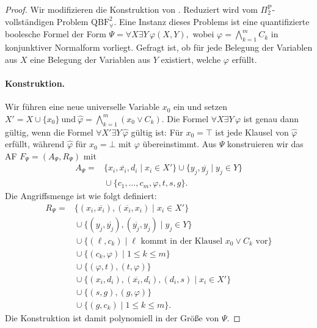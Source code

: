 \begin{proof}
    \label{pr:ocf-af-ci-co-pi^2-c-is-correct}
    Wir modifizieren die Konstruktion von \textcite{bluemel:2025:independence-aba}.
    Reduziert wird vom \(\Pi_2^{\mathrm{P}}\)-vollständigen Problem
    \(\mathrm{QBF}^{2}_{\forall}\). Eine Instanz dieses Problems ist
    eine quantifizierte boolesche Formel der Form
    \(\Psi=\forall X\exists Y\,\varphi(X,Y), \)
    wobei \(\varphi=\bigwedge_{k=1}^{m}C_k\) in konjunktiver
    Normalform vorliegt. Gefragt ist, ob für jede Belegung der
    Variablen aus \(X\) eine Belegung der Variablen aus \(Y\)
    existiert, welche \(\varphi\) erfüllt.

    \paragraph{Konstruktion.}
    Wir führen eine neue universelle
    Variable \(x_0\) ein und setzen
    \( X'=X\cup\{x_0\}~
        \text{und}~
        \widehat{\varphi}
        =
        \bigwedge_{k=1}^{m}(x_0\lor C_k).\)
    Die Formel \(\forall X\exists Y\,\varphi\) ist genau dann gültig,
    wenn die Formel \(\forall X'\exists Y\,\widehat{\varphi}\) gültig ist:
    Für \(x_0=\top\) ist jede Klausel von \(\widehat{\varphi}\) erfüllt,
    während \(\widehat{\varphi}\) für \(x_0=\bot\) mit \(\varphi\)
    übereinstimmt.
    Aus \(\Psi\) konstruieren wir das AF
    \(F_{\Psi}=(A_{\Psi},R_{\Psi})\) mit
    \[
    \begin{split}
        A_{\Psi}={}&
        \{x_i,\overline{x_i},d_i\mid x_i\in X'\}
        \cup
        \{y_j,\overline{y_j}\mid y_j\in Y\}\\
        &{}\cup
        \{c_1,\ldots,c_m,\varphi,t,s,g\}.
    \end{split}
    \]
    Die Angriffsmenge ist wie folgt definiert:
    \[
    \begin{split}
        R_{\Psi}={}&
        \{(x_i,\overline{x_i}),(\overline{x_i},x_i)
            \mid x_i\in X'\}\\
        &{}\cup
        \{(y_j,\overline{y_j}),(\overline{y_j},y_j)
            \mid y_j\in Y\}\\
        &{}\cup
        \{(\ell,c_k)
            \mid \ell\text{ kommt in der Klausel }
            x_0\lor C_k\text{ vor}\}\\
        &{}\cup
        \{(c_k,\varphi)\mid 1\leq k\leq m\}\\
        &{}\cup
        \{(\varphi,t),(t,\varphi)\}\\
        &{}\cup
        \{(x_i,d_i),(\overline{x_i},d_i),(d_i,s)
            \mid x_i\in X'\}\\
        &{}\cup
        \{(s,g),(g,\varphi)\}\\
        &{}\cup
        \{(g,c_k)\mid 1\leq k\leq m\}.
    \end{split}
    \]
    Die Konstruktion ist damit polynomiell in der
    Größe von \(\Psi\).


\end{proof}
